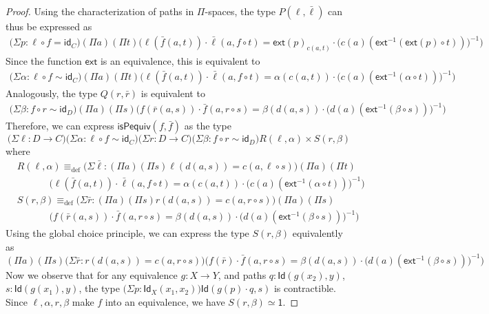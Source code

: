 \documentclass[reqno,10pt,a4paper,oneside]{amsart}
\numberwithin{equation}{section}
\theoremstyle{mythm}
\theoremstyle{mydef}
\theoremstyle{myrmk}
\newcommand{\deq}{\equiv}
\newcommand{\defeq}{\deq_{\mathrm{def}}}
\newcommand{\idfun}[1]{\mathsf{id}_{#1}}
\newcommand{\comp}{\circ}
\newcommand{\ext}{\mathsf{ext}}
\newcommand{\ct}{\cdot}
\newcommand{\Id}{\mathsf{Id}}
\newcommand{\one}{\mathsf{1}}
\begin{document}
\begin{proof}
Using the characterization of paths in $\Pi$-spaces, the type $P(\ell,\bar{\ell})$ can thus be expressed as
\begin{align*}
\big(\Sigma p : \ell \comp f = \idfun{C} \big) (\Pi a) (\Pi t) \Big(\ell(\bar{f}(a,t)) \ct \bar{\ell}(a, f \comp t) = \ext(p)_{c(a,t)} \ct \big(c(a)(\ext^{-1}(\ext(p) \circ t))\big)^{-1}\Big)
\end{align*}
Since the function $\ext$ is an equivalence, this is equivalent to
\begin{align*}
\big(\Sigma \alpha : \ell \circ f \sim \idfun{C} \big) (\Pi a) (\Pi t) \Big(\ell(\bar{f}(a,t)) \ct \bar{\ell}(a, f \comp t) = \alpha(c(a,t)) \ct \big(c(a)(\ext^{-1}(\alpha \circ t))\big)^{-1}\Big)
\end{align*}
Analogously, the type $Q(r,\bar{r})$ is equivalent to
\begin{align*}
\big(\Sigma \beta : f \comp r \sim \idfun{D} \big) (\Pi a) (\Pi s) \Big(f(\bar{r}(a,s)) \ct \bar{f}(a, r \comp s) = \beta(d(a,s)) \ct \big(d(a)(\ext^{-1}(\beta \circ s))\big)^{-1}\Big)
\end{align*}
Therefore, we can express $\mathsf{isPequiv}(f,\bar{f})$ as the type
\[ \big(\Sigma \ell : D\to C) \big(\Sigma \alpha : \ell \circ f \sim \idfun{C}\big) \big(\Sigma r : D\to C) \big(\Sigma \beta : f \circ r \sim \idfun{D}\big) R(\ell,\alpha) \times S(r,\beta)\]
where
\begin{align*}
& R(\ell,\alpha) \defeq \big(\Sigma \bar{\ell} : (\Pi a) (\Pi s) \ell(d(a,s))=c(a,\ell \circ s)\big) (\Pi a) (\Pi t) \\ & \;\;\;\;\;\;\;\;\;\;\;\; \Big(\ell(\bar{f}(a,t)) \ct \bar{\ell}(a, f \comp t) = \alpha(c(a,t)) \ct \big(c(a)(\ext^{-1}(\alpha \circ t))\big)^{-1}\Big) \\
& S(r,\beta) \defeq \big(\Sigma \bar{r} : (\Pi a) (\Pi s) r(d(a,s))=c(a,r \circ s) \big) (\Pi a) (\Pi s) \\ & \;\;\;\;\;\;\;\;\;\;\;\; \Big(f(\bar{r}(a,s)) \ct \bar{f}(a, r \comp s) = \beta(d(a,s)) \ct \big(d(a)(\ext^{-1}(\beta \circ s))\big)^{-1}\Big)
\end{align*}
Using the global choice principle, we can express the type $S(r,\beta)$ equivalently as
\[  (\Pi a) (\Pi s) \big(\Sigma \bar{r} : r(d(a,s))=c(a,r \circ s) \big) \Big(f(\bar{r}) \ct \bar{f}(a, r \comp s) = \beta(d(a,s)) \ct \big(d(a)(\ext^{-1}(\beta \circ s))\big)^{-1}\Big) \]
Now we observe that for any equivalence $g : X \to Y$, and paths $q : \Id(g(x_2),y)$, $s : \Id(g(x_1),y)$, the type $\big(\Sigma p : \Id_X(x_1,x_2)\big) \Id(g(p) \ct q,s)$ is contractible. Since $\ell, \alpha, r, \beta$ make $f$ into an equivalence, we have $S(r,\beta) \simeq \one$.


\end{proof}
\end{document}
